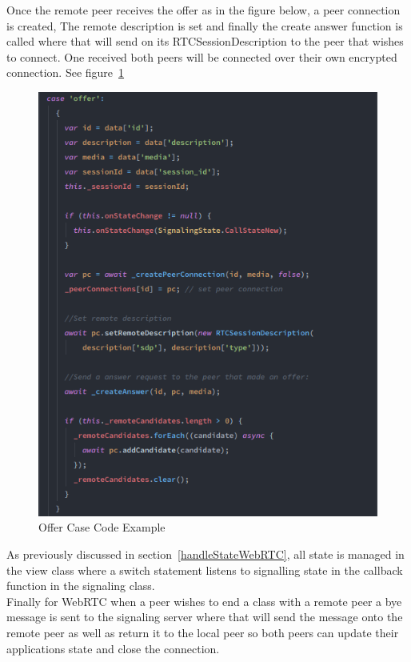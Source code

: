 Once the remote peer receives the offer as in the figure below, a peer connection is created,
The remote description is set and finally the create answer function is called where that will send on its RTCSessionDescription to the peer that wishes to connect. One received both peers will be connected over their own encrypted connection. See figure~\ref{image:offerCaseCode}
\begin{figure}[h!]
    \caption{Offer Case Code Example}
    \label{image:offerCaseCode}
    \centering
    \includegraphics[width=1.0\textwidth]{images/offer_case_code.png}
\end{figure}

As previously discussed in  section~\ref{handleStateWebRTC}, all state is managed in the view class where a switch statement listens to signalling state in the callback function in the signaling class.
\\ Finally for WebRTC when a peer wishes to end a class with a remote peer a bye message is sent to the signaling server where that will send the message onto the remote peer as well as return it to the local peer so both peers can update their applications state and close the connection.  



